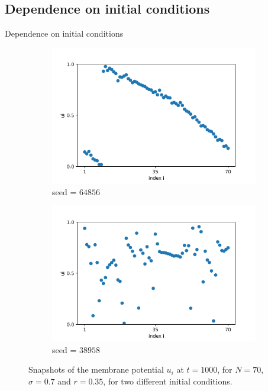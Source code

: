 \documentclass{beamer}
\begin{document}
\subsection{Dependence on initial conditions}
\begin{frame}{Dependence on initial conditions} \pause

\begin{figure}[H]
\begin{subfigure}{0.49 \textwidth}
\centering
\includegraphics[width=\linewidth]{u_seed=64856_t=1000.png}
\caption{seed = $64856$}
\label{chain}
\end{subfigure}
\hfill
\begin{subfigure}{0.49 \textwidth}
\centering
\includegraphics[width=\linewidth]{u_seed=38958_t=1000.png}
\caption{seed = $38958$} 
\label{chim}
\end{subfigure}
\caption{Snapshots of the membrane potential $u_i$ at $t=1000$, for $N=70$, $\sigma=0.7$ and $r=0.35$, for two different initial conditions.}
\end{figure} 

\end{frame}
\end{document}

